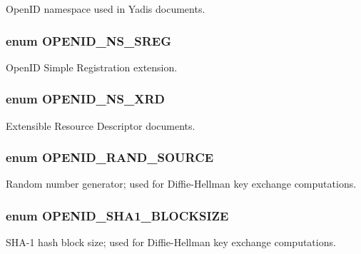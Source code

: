 \label{openid_8inc_aea9824c9d4564d018bcf5bf47efd6b15}
OpenID namespace used in Yadis documents. \hypertarget{openid_8inc_ab4113c07de00e2981c0710eea146fc89}{
\subsubsection[{OPENID\_\-NS\_\-SREG}]{\setlength{\rightskip}{0pt plus 5cm}enum {\bf OPENID\_\-NS\_\-SREG}}}
\label{openid_8inc_ab4113c07de00e2981c0710eea146fc89}
OpenID Simple Registration extension. \hypertarget{openid_8inc_a2c33b4d9ba800e52e8b26328fcaea53f}{
\subsubsection[{OPENID\_\-NS\_\-XRD}]{\setlength{\rightskip}{0pt plus 5cm}enum {\bf OPENID\_\-NS\_\-XRD}}}
\label{openid_8inc_a2c33b4d9ba800e52e8b26328fcaea53f}
Extensible Resource Descriptor documents. \hypertarget{openid_8inc_a231be0589d1284c2e59651c2265bbdd8}{
\subsubsection[{OPENID\_\-RAND\_\-SOURCE}]{\setlength{\rightskip}{0pt plus 5cm}enum {\bf OPENID\_\-RAND\_\-SOURCE}}}
\label{openid_8inc_a231be0589d1284c2e59651c2265bbdd8}
Random number generator; used for Diffie-\/Hellman key exchange computations. \hypertarget{openid_8inc_a6cfc7125130551f147ad67a205750b64}{
\subsubsection[{OPENID\_\-SHA1\_\-BLOCKSIZE}]{\setlength{\rightskip}{0pt plus 5cm}enum {\bf OPENID\_\-SHA1\_\-BLOCKSIZE}}}
\label{openid_8inc_a6cfc7125130551f147ad67a205750b64}
SHA-\/1 hash block size; used for Diffie-\/Hellman key exchange computations. 

